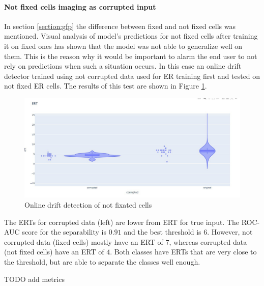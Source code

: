             \paragraph{Not fixed cells imaging as corrupted input}
                In section \ref{section:gfp} the difference between fixed and not fixed cells was mentioned. Visual analysis of model's predictions for not fixed cells after training it on fixed ones has shown that the model was not able to generalize well on them. This is the reason why it would be important to alarm the end user to not rely on predictions when such a situation occurs. In this case an online drift detector trained using not corrupted data used for ER training first and tested on not fixed ER cells. The results of this test are shown in Figure \ref{fig:online-drift-not-fixed}.
                \begin{figure}[H]
                    \begin{center}
                        \includegraphics[width=0.5\linewidth]{bilder/drift-detection/online-fixed-vs-not-fixed.jpg}
                        \caption{Online drift detection of not fixated cells}\label{fig:online-drift-not-fixed}
                    \end{center}
                \end{figure}
                The ERTs for corrupted data (left) are lower from ERT for true input. The ROC-AUC score for the separability is $0.91$ and the best threshold is $6$. However, not corrupted data (fixed cells) mostly have an ERT of $7$, whereas corrupted data (not fixed cells) have an ERT of $4$. Both classes have ERTs that are very close to the threshold, but are able to separate the classes well enough.

                TODO add metrics